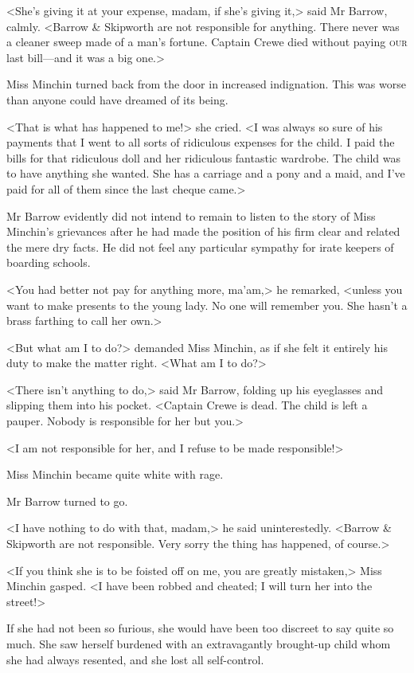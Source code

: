 <She's giving it at your expense, madam, if she's giving it,> said Mr Barrow, calmly. <Barrow \& Skipworth are not responsible for anything. There never was a cleaner sweep made of a man's fortune. Captain Crewe died without paying \textsc{our} last bill—and it was a big one.>

Miss Minchin turned back from the door in increased indignation. This was worse than anyone could have dreamed of its being.

<That is what has happened to me!> she cried. <I was always so sure of his payments that I went to all sorts of ridiculous expenses for the child. I paid the bills for that ridiculous doll and her ridiculous fantastic wardrobe. The child was to have anything she wanted. She has a carriage and a pony and a maid, and I've paid for all of them since the last cheque came.>

Mr Barrow evidently did not intend to remain to listen to the story of Miss Minchin's grievances after he had made the position of his firm clear and related the mere dry facts. He did not feel any particular sympathy for irate keepers of boarding schools.

<You had better not pay for anything more, ma'am,> he remarked, <unless you want to make presents to the young lady. No one will remember you. She hasn't a brass farthing to call her own.>

<But what am I to do?> demanded Miss Minchin, as if she felt it entirely his duty to make the matter right. <What am I to do?>

<There isn't anything to do,> said Mr Barrow, folding up his eyeglasses and slipping them into his pocket. <Captain Crewe is dead. The child is left a pauper. Nobody is responsible for her but you.>

<I am not responsible for her, and I refuse to be made responsible!>

Miss Minchin became quite white with rage.

Mr Barrow turned to go.

<I have nothing to do with that, madam,> he said uninterestedly. <Barrow \& Skipworth are not responsible. Very sorry the thing has happened, of course.>

<If you think she is to be foisted off on me, you are greatly mistaken,> Miss Minchin gasped. <I have been robbed and cheated; I will turn her into the street!>

If she had not been so furious, she would have been too discreet to say quite so much. She saw herself burdened with an extravagantly brought-up child whom she had always resented, and she lost all self-control.

